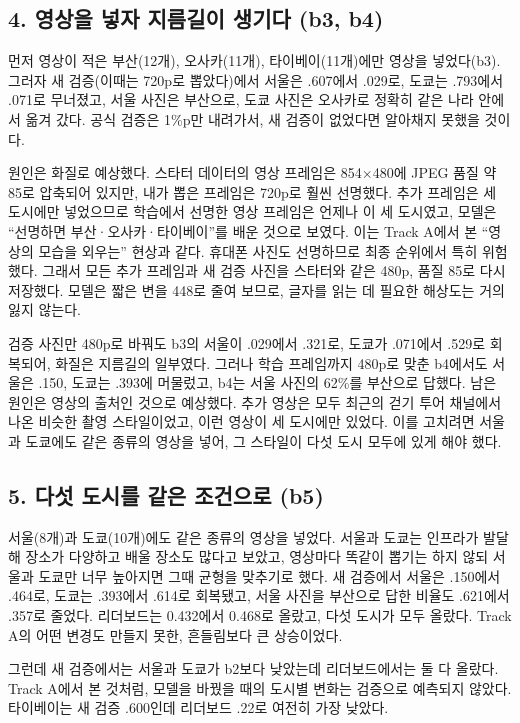 \documentclass[11pt]{article}
\begin{document}
\subsection*{4. 영상을 넣자 지름길이 생기다 (b3, b4)}

먼저 영상이 적은 부산(12개), 오사카(11개), 타이베이(11개)에만 영상을 넣었다(b3). 그러자 새 검증(이때는 720p로 뽑았다)에서 서울은 .607에서 .029로, 도쿄는 .793에서 .071로 무너졌고, 서울 사진은 부산으로, 도쿄 사진은 오사카로 정확히 같은 나라 안에서 옮겨 갔다. 공식 검증은 1\%p만 내려가서, 새 검증이 없었다면 알아채지 못했을 것이다.

원인은 화질로 예상했다. 스타터 데이터의 영상 프레임은 854×480에 JPEG 품질 약 85로 압축되어 있지만, 내가 뽑은 프레임은 720p로 훨씬 선명했다. 추가 프레임은 세 도시에만 넣었으므로 학습에서 선명한 영상 프레임은 언제나 이 세 도시였고, 모델은 ``선명하면 부산·오사카·타이베이''를 배운 것으로 보였다. 이는 Track A에서 본 ``영상의 모습을 외우는'' 현상과 같다. 휴대폰 사진도 선명하므로 최종 순위에서 특히 위험했다. 그래서 모든 추가 프레임과 새 검증 사진을 스타터와 같은 480p, 품질 85로 다시 저장했다. 모델은 짧은 변을 448로 줄여 보므로, 글자를 읽는 데 필요한 해상도는 거의 잃지 않는다.

검증 사진만 480p로 바꿔도 b3의 서울이 .029에서 .321로, 도쿄가 .071에서 .529로 회복되어, 화질은 지름길의 일부였다. 그러나 학습 프레임까지 480p로 맞춘 b4에서도 서울은 .150, 도쿄는 .393에 머물렀고, b4는 서울 사진의 62\%를 부산으로 답했다. 남은 원인은 영상의 출처인 것으로 예상했다. 추가 영상은 모두 최근의 걷기 투어 채널에서 나온 비슷한 촬영 스타일이었고, 이런 영상이 세 도시에만 있었다. 이를 고치려면 서울과 도쿄에도 같은 종류의 영상을 넣어, 그 스타일이 다섯 도시 모두에 있게 해야 했다.

\subsection*{5. 다섯 도시를 같은 조건으로 (b5)}

서울(8개)과 도쿄(10개)에도 같은 종류의 영상을 넣었다. 서울과 도쿄는 인프라가 발달해 장소가 다양하고 배울 장소도 많다고 보았고, 영상마다 똑같이 뽑기는 하지 않되 서울과 도쿄만 너무 높아지면 그때 균형을 맞추기로 했다. 새 검증에서 서울은 .150에서 .464로, 도쿄는 .393에서 .614로 회복됐고, 서울 사진을 부산으로 답한 비율도 .621에서 .357로 줄었다. 리더보드는 0.432에서 0.468로 올랐고, 다섯 도시가 모두 올랐다. Track A의 어떤 변경도 만들지 못한, 흔들림보다 큰 상승이었다.

그런데 새 검증에서는 서울과 도쿄가 b2보다 낮았는데 리더보드에서는 둘 다 올랐다. Track A에서 본 것처럼, 모델을 바꿨을 때의 도시별 변화는 검증으로 예측되지 않았다. 타이베이는 새 검증 .600인데 리더보드 .22로 여전히 가장 낮았다.
\end{document}
